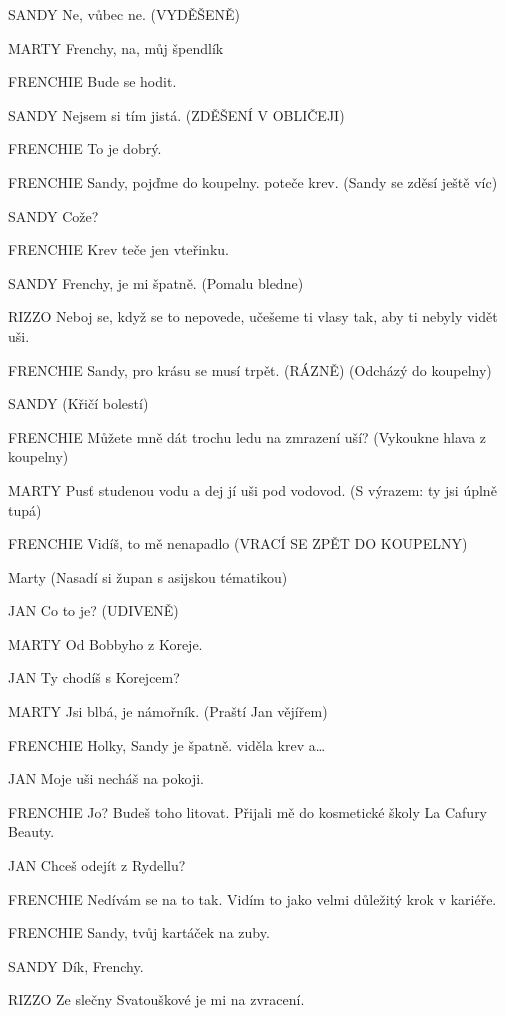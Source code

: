 SANDY        Ne, vůbec ne. (VYDĚŠENĚ)

MARTY        Frenchy, na, můj špendlík

FRENCHIE        Bude se hodit. 

SANDY        Nejsem si tím jistá. (ZDĚŠENÍ V OBLIČEJI)

FRENCHIE        To je dobrý. 

FRENCHIE        Sandy, pojďme do koupelny. poteče krev. (Sandy se zděsí ještě víc)

SANDY        Cože?

FRENCHIE        Krev teče jen vteřinku.

SANDY        Frenchy, je mi špatně. (Pomalu bledne)

RIZZO        Neboj se, když se to nepovede, učešeme ti vlasy tak, aby ti nebyly vidět         uši.

FRENCHIE        Sandy, pro krásu se musí trpět. (RÁZNĚ) (Odcházý do koupelny) 

SANDY        (Křičí bolestí)

FRENCHIE        Můžete mně dát trochu ledu na zmrazení uší? (Vykoukne hlava z                 koupelny)

MARTY        Pusť studenou vodu a dej jí uši pod vodovod. (S výrazem: ty jsi úplně         tupá) 

FRENCHIE        Vidíš, to mě nenapadlo (VRACÍ SE ZPĚT DO KOUPELNY)

 Marty  (Nasadí si župan s asijskou tématikou)

JAN        Co to je? (UDIVENĚ)

MARTY        Od Bobbyho z Koreje.

JAN        Ty chodíš s Korejcem? 

MARTY        Jsi blbá, je námořník. (Praští Jan vějířem) 

FRENCHIE        Holky, Sandy je špatně. viděla krev a…

JAN        Moje uši necháš na pokoji.

FRENCHIE        Jo? Budeš toho litovat. Přijali mě do kosmetické školy La Cafury Beauty.

JAN        Chceš odejít z Rydellu?

FRENCHIE        Nedívám se na to tak. Vidím to jako velmi důležitý krok v kariéře.

FRENCHIE        Sandy, tvůj kartáček na zuby.

SANDY        Dík, Frenchy. 

RIZZO        Ze slečny Svatouškové je mi na zvracení.

